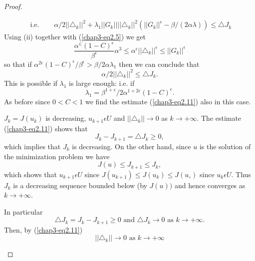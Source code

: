 \begin{proof}
\begin{step}
\begin{align*}
\text{ i.e. }\quad & \alpha / 2 ||\triangle_{k}||^{2} + \lambda_{1} ||G_{k}|| ||\triangle_{k}||^{2} (||G_{k}||^{\epsilon} - \beta/ (2\alpha \lambda)) \leq \triangle J_{k}
\end{align*}\pageoriginale
Using (ii) together with (\ref{chap3-eq2.5}) we get
$$
\dfrac{\alpha^{\in}(1-C)^{\epsilon}}{\beta^{\epsilon}} \alpha^{3} \leq \alpha^{\epsilon} ||\triangle_{k}||^{\epsilon} \leq ||G_{k}||^{\epsilon}
$$
so that if $\alpha^{2\epsilon} (1-C)^{\epsilon} / \beta^{\epsilon} > \beta / 2\alpha \lambda_{1}$ then we can conclude that
$$
\alpha / 2 ||\triangle_{k}||^{2} \leq \triangle J_{k}.
$$
This is possible if $\lambda_{1}$ is large enough: i.e. if
\begin{equation*}
\lambda_{1} = \beta^{1+\epsilon} / 2\alpha^{1+2 \epsilon} (1-C)^{\epsilon}.\tag{2.14}\label{chap3-eq2.14}
\end{equation*}
As before since $0 < C < 1$ we find the estimate (\ref{chap3-eq2.11}) also in this case.
\end{step}

\begin{step}%
 $J_{k} = J(u_{k})$ is decreasing, $u_{k+1} \epsilon U$ and $|| \triangle_{k} || \to 0$ as $k \to + \infty$. The estimate (\ref{chap3-eq2.11}) shows that
$$
J_{k} - J_{k+1} = \triangle J_{k} \geq 0,
$$
which implies that $J_{k}$ is decreasing. On the other hand, since $u$ is the solution of the minimization problem we have
$$
J(u) \leq J_{k+1} \leq J_{k},
$$
which shows that $u_{k+1} \epsilon U$ since $J(u_{k+1}) \leq J(u_{k}) \leq J(u_{\circ})$ since $u_{k} \epsilon U$. Thus $J_{k}$ is a decreasing sequence bounded below (by $J(u))$ and hence converges as $k \to + \infty$.

In particular
$$
\triangle J_{k} = J_{k} - J_{k+1} \geq 0 \text{ and } \triangle J_{k} \to 0 \text{ as } k \to + \infty.
$$
Then, by (\ref{chap3-eq2.11})
\begin{equation*}
|| \triangle_{k} || \to 0 \text{ as } k \to + \infty\tag{2.15}\label{chap3-eq2.15}
\end{equation*}\pageoriginale
\end{step}


\end{proof}
